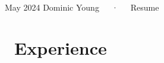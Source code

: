 \documentclass[11pt,a4paper,]{sr-awesome-cv}
\begin{document}
\makecvheader

\makecvfooter
  {May 2024}
    {Dominic Young~~~·~~~Resume}
  {\thepage}





\hypertarget{experience}{%
\section{\faBriefcase~Experience}\label{experience}}
\end{document}
